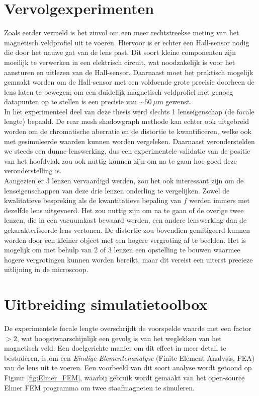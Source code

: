 \documentclass[we,twoside,openright,a4paper,11pt]{uantwerpenbamathesis}
\begin{document}
\section{Vervolgexperimenten}
Zoals eerder vermeld is het zinvol om een meer rechtstreekse meting van het magnetisch veldprofiel uit te voeren. Hiervoor is er echter een Hall-sensor nodig die door het nauwe gat van de lens past. Dit soort kleine componenten zijn moeilijk te verwerken in een elektrisch circuit, wat noodzakelijk is voor het aansturen en uitlezen van de Hall-sensor. Daarnaast moet het praktisch mogelijk gemaakt worden om de Hall-sensor met een voldoende grote precisie doorheen de lens laten te bewegen; om een duidelijk magnetisch veldprofiel met genoeg datapunten op te stellen is een precisie van $\sim 50 ~\mu$m gewenst.\\

In het experimenteel deel van deze thesis werd slechts 1 lenseigenschap (de focale lengte) bepaald. De rear mesh shadowgraph methode kan echter ook uitgebreid worden om de chromatische aberratie en de distortie te kwantificeren, welke ook met gesimuleerde waarden kunnen worden vergeleken. Daarnaast veronderstelden we steeds een dunne lenswerking, dus een experimentele validatie van de positie van het hoofdvlak zou ook nuttig kunnen zijn om na te gaan hoe goed deze veronderstelling is.\\

Aangezien er 3 lenzen vervaardigd werden, zou het ook interessant zijn om de lenseigenschappen van deze drie lenzen onderling te vergelijken. Zowel de kwalitatieve bespreking als de kwantitatieve bepaling van $f$ werden immers met dezelfde lens uitgevoerd. Het zou nuttig zijn om na te gaan of de overige twee lenzen, die in een vacuumkast bewaard werden, een andere lenswerking dan de gekarakteriseerde lens vertonen. De distortie zou bovendien gemitigeerd kunnen worden door een kleiner object met een hogere vergroting af te beelden. Het is mogelijk om met behulp van 2 of 3 lenzen een opstelling te bouwen waarmee hogere vergrotingen kunnen worden bereikt, maar dit vereist een uiterst precieze uitlijning in de microscoop.

\section{Uitbreiding simulatietoolbox}
De experimentele focale lengte overschrijdt de voorspelde waarde met een factor $>2$, wat hoogstwaarschijnlijk een gevolg is van het weglekken van het magnetisch veld. Een doelgerichte manier om dit effect in meer detail te bestuderen, is om een \textit{Eindige-Elementenanalyse} (Finite Element Analysis, FEA) van de lens uit te voeren. Een voorbeeld van dit soort analyse wordt getoond op Figuur \ref{fig:Elmer_FEM}, waarbij gebruik wordt gemaakt van het open-source Elmer FEM programma om twee staafmagneten te simuleren.\\
\end{document}
